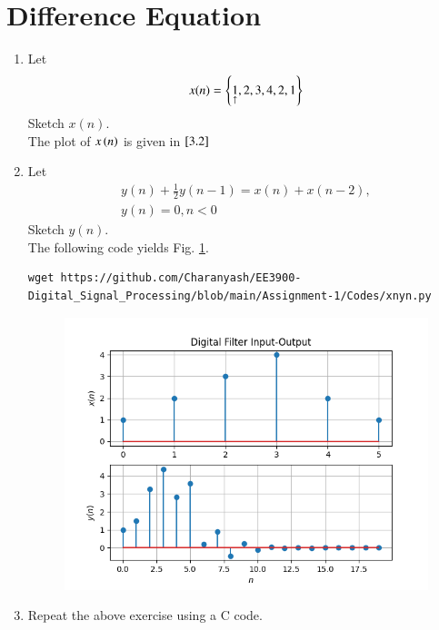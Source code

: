 \documentclass[journal,12pt,twocolumn]{IEEEtran}
\renewcommand\thesection{\arabic{section}}
\begin{document}
\section{Difference Equation}
\begin{enumerate}[label=\thesection.\arabic*,ref=\thesection.\theenumi]
\item Let \label{def:xn}
\begin{equation}
x(n) = \left\{\underset{\uparrow}{1},2,3,4,2,1\right\}\label{xn}
\end{equation}
Sketch $x(n)$.\\
\solution The plot of $x\left(n\right)$ is given in $\ref{3.2}$
\item \label{3.2} Let
\begin{multline}
\label{eq:iir_filter}
y(n) + \frac{1}{2}y(n-1) = x(n) + x(n-2), 
\\
 y(n) = 0, n < 0
\end{multline}
Sketch $y(n)$.\\
\solution The following code yields Fig. \ref{fig:xnyn}.
\begin{lstlisting}
wget https://github.com/Charanyash/EE3900-Digital_Signal_Processing/blob/main/Assignment-1/Codes/xnyn.py
\end{lstlisting}
\begin{figure}[!ht]
\begin{center}
\includegraphics[width=\columnwidth]{Figs/xnyn.png}
\end{center}
\label{fig:xnyn}	
\end{figure}
\item Repeat the above exercise using a C code.\\

\end{enumerate}
\end{document}

